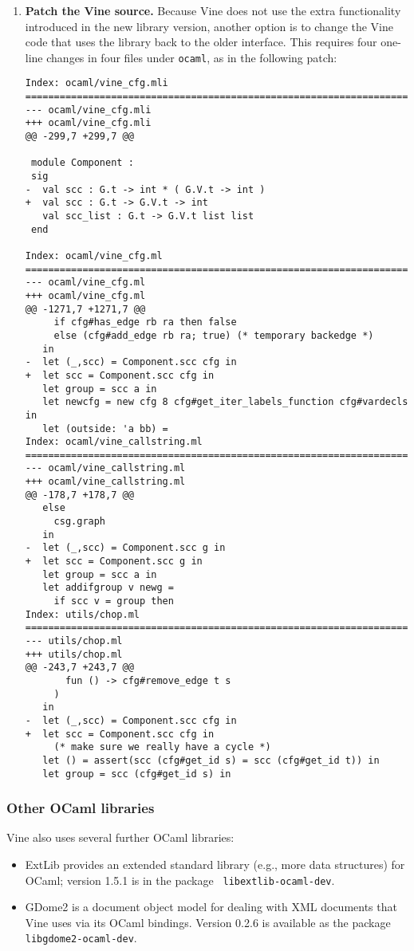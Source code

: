\documentclass[11pt,onecolumn]{article}
\begin{document}
\begin{enumerate}
\item {\bf Patch the Vine source.}
Because Vine does not use the extra functionality introduced in the
new library version, another option is to change the Vine code that
uses the library back to the older interface.
%
This requires four one-line changes in four files under {\tt ocaml},
as in the following patch:

\begin{Verbatim}[frame=lines, framesep=.5em]
Index: ocaml/vine_cfg.mli
===================================================================
--- ocaml/vine_cfg.mli
+++ ocaml/vine_cfg.mli
@@ -299,7 +299,7 @@
 
 module Component :
 sig
-  val scc : G.t -> int * ( G.V.t -> int )
+  val scc : G.t -> G.V.t -> int
   val scc_list : G.t -> G.V.t list list
 end
 
Index: ocaml/vine_cfg.ml
===================================================================
--- ocaml/vine_cfg.ml
+++ ocaml/vine_cfg.ml
@@ -1271,7 +1271,7 @@
     if cfg#has_edge rb ra then false
     else (cfg#add_edge rb ra; true) (* temporary backedge *)
   in
-  let (_,scc) = Component.scc cfg in
+  let scc = Component.scc cfg in
   let group = scc a in
   let newcfg = new cfg 8 cfg#get_iter_labels_function cfg#vardecls in
   let (outside: 'a bb) =
Index: ocaml/vine_callstring.ml
===================================================================
--- ocaml/vine_callstring.ml
+++ ocaml/vine_callstring.ml
@@ -178,7 +178,7 @@
   else 
     csg.graph 
   in 
-  let (_,scc) = Component.scc g in 
+  let scc = Component.scc g in 
   let group = scc a in 
   let addifgroup v newg = 
     if scc v = group then
Index: utils/chop.ml
===================================================================
--- utils/chop.ml
+++ utils/chop.ml
@@ -243,7 +243,7 @@
       fun () -> cfg#remove_edge t s 
     ) 
   in
-  let (_,scc) = Component.scc cfg in
+  let scc = Component.scc cfg in
     (* make sure we really have a cycle *)
   let () = assert(scc (cfg#get_id s) = scc (cfg#get_id t)) in 
   let group = scc (cfg#get_id s) in
\end{Verbatim}
\end{enumerate}

\subsubsection{Other OCaml libraries}

Vine also uses several further OCaml libraries:
\begin{itemize}
\item ExtLib provides an extended standard library (e.g., more data
  structures) for OCaml; version 1.5.1 is in the package {\tt
    libextlib-ocaml-dev}.
\item GDome2 is a document object model for dealing with XML documents
  that Vine uses via its OCaml bindings. Version 0.2.6 is available as
  the package {\tt libgdome2-ocaml-dev}.
\end{itemize}
\end{document}
